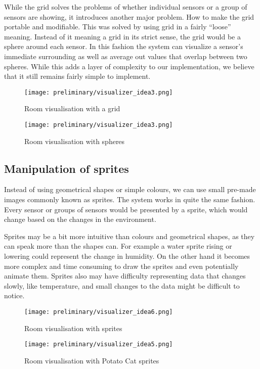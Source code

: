 \documentclass[../document]{subfiles}
\begin{document}
While the grid solves the problems of whether individual sensors or a group of sensors are showing, it introduces another major problem. How to make the grid portable and modifiable. This was solved by using grid in a fairly “loose” meaning. Instead of it meaning a grid in its strict sense, the grid would be a sphere around each sensor. In this fashion the system can visualize a sensor’s immediate surrounding as well as average out values that overlap between two spheres. While this adds a layer of complexity to our implementation, we believe that it still remains fairly simple to implement.

\begin{figure}
	\texttt{[image: preliminary/visualizer\_idea3.png]}
	\caption{Room visualisation with a grid}
\end{figure}

\begin{figure}
	\texttt{[image: preliminary/visualizer\_idea3.png]}
	\caption{Room visualisation with spheres}
\end{figure}

\subsection{Manipulation of sprites}
Instead of using geometrical shapes or simple colours, we can use small pre-made images commonly known as sprites. The system works in quite the same fashion. Every sensor or groups of sensors would be presented by a sprite, which would change based on the changes in the environment.

Sprites may be a bit more intuitive than colours and geometrical shapes, as they can speak more than the shapes can. For example a water sprite rising or lowering could represent the change in humidity. On the other hand it becomes more complex and time consuming to draw the sprites and even potentially animate them. Sprites also may have difficulty representing data that changes slowly, like temperature, and small changes to the data might be difficult to notice.

\begin{figure}
	\texttt{[image: preliminary/visualizer\_idea6.png]}
	\caption{Room visualisation with sprites}
\end{figure}

\begin{figure}
	\texttt{[image: preliminary/visualizer\_idea5.png]}
	\caption{Room visualisation with Potato Cat sprites}
\end{figure}
\end{document}
